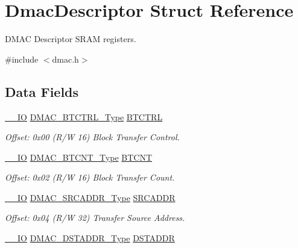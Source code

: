 \hypertarget{struct_dmac_descriptor}{}\section{Dmac\+Descriptor Struct Reference}
\label{struct_dmac_descriptor}


D\+M\+AC Descriptor S\+R\+AM registers.  




{\ttfamily \#include $<$dmac.\+h$>$}

\subsection*{Data Fields}
\begin{DoxyCompactItemize}
\item 
\mbox{\hyperlink{core__cm0plus_8h_aec43007d9998a0a0e01faede4133d6be}{\+\_\+\+\_\+\+IO}} \mbox{\hyperlink{union_d_m_a_c___b_t_c_t_r_l___type}{D\+M\+A\+C\+\_\+\+B\+T\+C\+T\+R\+L\+\_\+\+Type}} \mbox{\hyperlink{struct_dmac_descriptor_a88d1dbe42db9afd1c76f28a8df3264e0}{B\+T\+C\+T\+RL}}
\begin{DoxyCompactList}\small\item\em Offset\+: 0x00 (R/W 16) Block Transfer Control. \end{DoxyCompactList}\item 
\mbox{\hyperlink{core__cm0plus_8h_aec43007d9998a0a0e01faede4133d6be}{\+\_\+\+\_\+\+IO}} \mbox{\hyperlink{union_d_m_a_c___b_t_c_n_t___type}{D\+M\+A\+C\+\_\+\+B\+T\+C\+N\+T\+\_\+\+Type}} \mbox{\hyperlink{struct_dmac_descriptor_a661d265c3dd9eec59e6f687eddaa3e6f}{B\+T\+C\+NT}}
\begin{DoxyCompactList}\small\item\em Offset\+: 0x02 (R/W 16) Block Transfer Count. \end{DoxyCompactList}\item 
\mbox{\hyperlink{core__cm0plus_8h_aec43007d9998a0a0e01faede4133d6be}{\+\_\+\+\_\+\+IO}} \mbox{\hyperlink{union_d_m_a_c___s_r_c_a_d_d_r___type}{D\+M\+A\+C\+\_\+\+S\+R\+C\+A\+D\+D\+R\+\_\+\+Type}} \mbox{\hyperlink{struct_dmac_descriptor_a9e61b7d0eff969d967dfca4eaf65ece3}{S\+R\+C\+A\+D\+DR}}
\begin{DoxyCompactList}\small\item\em Offset\+: 0x04 (R/W 32) Transfer Source Address. \end{DoxyCompactList}\item 
\mbox{\hyperlink{core__cm0plus_8h_aec43007d9998a0a0e01faede4133d6be}{\+\_\+\+\_\+\+IO}} \mbox{\hyperlink{union_d_m_a_c___d_s_t_a_d_d_r___type}{D\+M\+A\+C\+\_\+\+D\+S\+T\+A\+D\+D\+R\+\_\+\+Type}} \mbox{\hyperlink{struct_dmac_descriptor_af2289e9979f4beae2ca64fde972762b9}{D\+S\+T\+A\+D\+DR}}

\end{DoxyCompactItemize}

